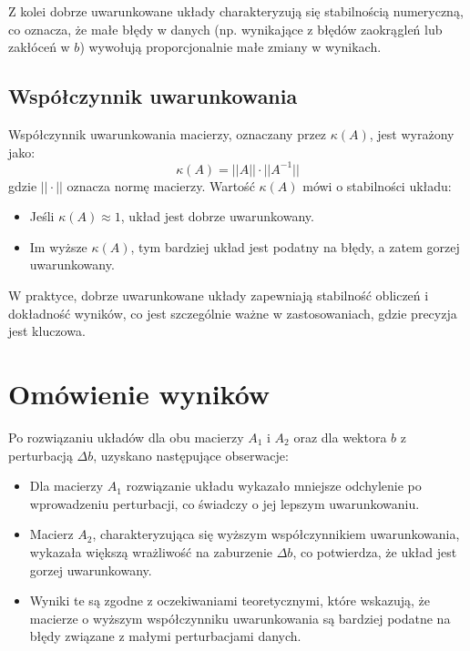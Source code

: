 \documentclass[a4paper, 12pt]{article}
\begin{document}
Z kolei dobrze uwarunkowane układy charakteryzują się stabilnością numeryczną, co oznacza, że małe błędy w danych (np. wynikające z błędów zaokrągleń lub zakłóceń w \( b \)) wywołują proporcjonalnie małe zmiany w wynikach.

\subsection{Współczynnik uwarunkowania}
Współczynnik uwarunkowania macierzy, oznaczany przez \( \kappa(A) \), jest wyrażony jako:
\[
\kappa(A) = ||A|| \cdot ||A^{-1}||
\]
gdzie \( || \cdot || \) oznacza normę macierzy. Wartość \( \kappa(A) \) mówi o stabilności układu:
\begin{itemize}
    \item Jeśli \( \kappa(A) \approx 1 \), układ jest dobrze uwarunkowany.
    \item Im wyższe \( \kappa(A) \), tym bardziej układ jest podatny na błędy, a zatem gorzej uwarunkowany.
\end{itemize}
W praktyce, dobrze uwarunkowane układy zapewniają stabilność obliczeń i dokładność wyników, co jest szczególnie ważne w zastosowaniach, gdzie precyzja jest kluczowa.

\section{Omówienie wyników}
Po rozwiązaniu układów dla obu macierzy \( A_1 \) i \( A_2 \) oraz dla wektora \( b \) z perturbacją \( \Delta b \), uzyskano następujące obserwacje:
\begin{itemize}
    \item Dla macierzy \( A_1 \) rozwiązanie układu wykazało mniejsze odchylenie po wprowadzeniu perturbacji, co świadczy o jej lepszym uwarunkowaniu.
    \item Macierz \( A_2 \), charakteryzująca się wyższym współczynnikiem uwarunkowania, wykazała większą wrażliwość na zaburzenie \( \Delta b \), co potwierdza, że układ jest gorzej uwarunkowany.
    \item Wyniki te są zgodne z oczekiwaniami teoretycznymi, które wskazują, że macierze o wyższym współczynniku uwarunkowania są bardziej podatne na błędy związane z małymi perturbacjami danych.
\end{itemize}
\end{document}
